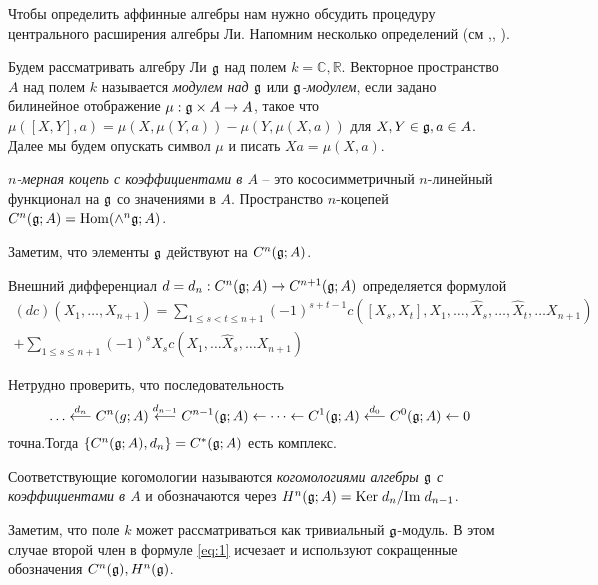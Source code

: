 Чтобы определить аффинные алгебры нам нужно обсудить процедуру центрального расширения алгебры Ли.
Напомним несколько определений (см \cite{fuks1986cohomology},\cite{fuks1984}, \cite{feigin1988}).
\begin{definition}
Будем рассматривать алгебру Ли $\mathfrak{g}$ над полем $k=\mathbb{C},\mathbb{R}$. Векторное пространство $A$ над полем $k$ называется {\it модулем над $\mathfrak{g}$} или {\it $\mathfrak{g}$-модулем}, если задано билинейное отображение $\mu:\mathfrak{g}\times A\to A$, такое что $\mu([X,Y],a)=\mu(X,\mu(Y,a))-\mu(Y,\mu(X,a))$ для $X,Y\in \mathfrak{g}, a\in A$. Далее мы будем опускать символ $\mu$ и писать $X a= \mu(X,a)$.
\end{definition}
\begin{definition}
  {\it $n$-мерная коцепь с коэффициентами в $A$} -- это кососимметричный $n$-линейный функционал на $\mathfrak{g}$ со значениями в $A$. Пространство $n$-коцепей $C^{n}(\mathfrak{g};A)=\mathrm{Hom}(\wedge^{n}\mathfrak{g};A)$.
\end{definition}
Заметим, что элементы $\mathfrak{g}$ действуют на $C^{n}(\mathfrak{g};A)$.
\begin{definition}
  Внешний дифференциал $d=d_{n}:C^{n}(\mathfrak{g};A)\to C^{n+1}(\mathfrak{g};A)$ определяется формулой
  \begin{multline}
    \label{eq:1}
    (dc) (X_{1},\dots, X_{n+1})=\sum_{1\leq s<t\leq n+1} (-1)^{s+t-1} c([X_{s},X_{t}],X_{1},\dots,\hat X_{s},\dots,\hat X_{t},\dots X_{n+1})\\
    +\sum_{1\leq s\leq n+1} (-1)^{s}X_{s} c(X_{1},\dots \hat X_{s},\dots X_{n+1})
  \end{multline}
\end{definition}
Нетрудно проверить, что последовательность
\begin{equation}
  \label{eq:2}
  \dots\stackrel{d_{n}}{\longleftarrow} C^{n}(g;A)\stackrel{d_{n-1}}{\longleftarrow} C^{n-1}(\mathfrak{g};A)\leftarrow \dots \leftarrow C^{1}(\mathfrak{g};A) \stackrel{d_{0}}{\longleftarrow} C^{0}(\mathfrak{g};A)\leftarrow 0
\end{equation}
точна.Тогда $\{C^{n}(\mathfrak{g};A),d_{n}\}=C^{*}(\mathfrak{g};A)$ есть комплекс.
\begin{definition}
Соответствующие когомологии называются {\it когомологиями алгебры $\mathfrak{g}$ с коэффициентами в $A$} и обозначаются через $H^{n}(\mathfrak{g};A)=\mathrm{Ker}\; d_{n}/\mathrm{Im}\; d_{n-1}$. 
  
\end{definition}
Заметим, что поле $k$ может рассматриваться как тривиальный $\mathfrak{g}$-модуль. В этом случае второй член в формуле \eqref{eq:1} исчезает и используют сокращенные обозначения $C^{n}(\mathfrak{g}), H^{n}(\mathfrak{g})$.
